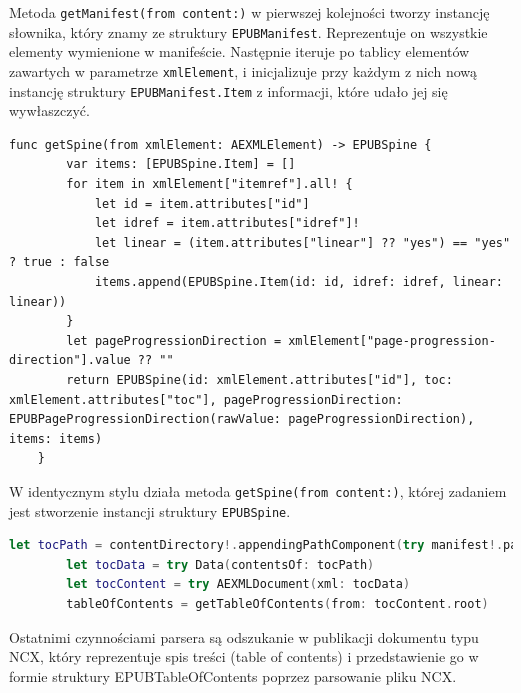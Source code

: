 Metoda \texttt{getManifest(from content:)} w pierwszej kolejności tworzy instancję słownika, który znamy ze struktury \texttt{EPUBManifest}. Reprezentuje on wszystkie elementy wymienione w manifeście. Następnie iteruje po tablicy elementów zawartych w parametrze \texttt{xmlElement}, i inicjalizuje przy każdym z nich nową instancję struktury \texttt{EPUBManifest.Item} z informacji, które udało jej się wywłaszczyć.

\begin{lstlisting}[caption={Implementacja metody \texttt{getSpine(from xmlElement:)}},language=swift-reference,label=jjjj]
    func getSpine(from xmlElement: AEXMLElement) -> EPUBSpine {
        var items: [EPUBSpine.Item] = []
        for item in xmlElement["itemref"].all! {
            let id = item.attributes["id"]
            let idref = item.attributes["idref"]!
            let linear = (item.attributes["linear"] ?? "yes") == "yes" ? true : false
            items.append(EPUBSpine.Item(id: id, idref: idref, linear: linear))
        }
        let pageProgressionDirection = xmlElement["page-progression-direction"].value ?? ""
        return EPUBSpine(id: xmlElement.attributes["id"], toc: xmlElement.attributes["toc"], pageProgressionDirection: EPUBPageProgressionDirection(rawValue: pageProgressionDirection), items: items)
    }
\end{lstlisting}

W identycznym stylu działa metoda \texttt{getSpine(from content:)}, której zadaniem jest stworzenie instancji struktury \texttt{EPUBSpine}.

\begin{lstlisting}[firstnumber=19, language=swift,caption=test,label=test]
        let tocPath = contentDirectory!.appendingPathComponent(try manifest!.path(forItemWithId: spine?.toc ?? ""))
        let tocData = try Data(contentsOf: tocPath)
        let tocContent = try AEXMLDocument(xml: tocData)
        tableOfContents = getTableOfContents(from: tocContent.root)
\end{lstlisting}

Ostatnimi czynnościami parsera są odszukanie w publikacji dokumentu typu NCX, który reprezentuje spis treści (table of contents) i przedstawienie go w formie struktury EPUBTableOfContents poprzez parsowanie pliku NCX.

